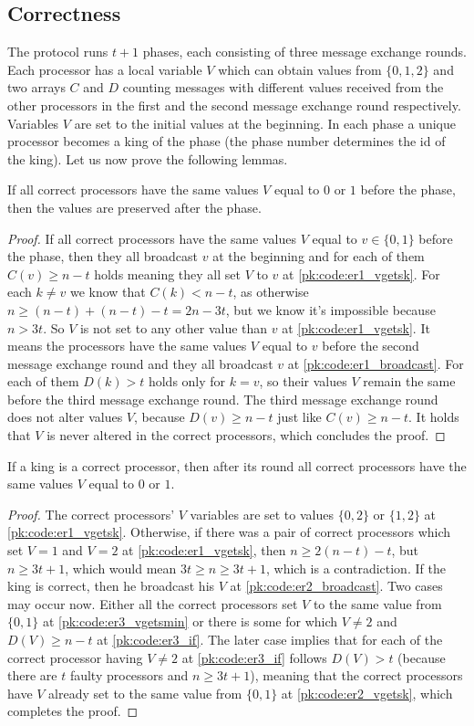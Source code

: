 \subsection{Correctness}
The protocol runs $t+1$ phases, each consisting of three message exchange rounds. Each processor has a local variable $V$ which can obtain values from $\{0,1,2\}$ and two arrays $C$ and $D$ counting messages with different values received from the other processors in the first and the second message exchange round respectively. Variables $V$ are set to the initial values at the beginning. In each phase a unique processor becomes a king of the phase (the phase number determines the id of the king). Let us now prove the following lemmas.
\begin{lemma}\label{pk:lem:preserve}
If all correct processors have the same values $V$ equal to $0$ or $1$ before the phase, then the values are preserved after the phase.
\end{lemma} 
\begin{proof}
If all correct processors have the same values $V$ equal to $v\in\{0,1\}$ before the phase, then they all broadcast $v$ at the beginning and for each of them $C(v) \geq n-t$ holds meaning they all set $V$ to $v$ at \cref{pk:code:er1_vgetsk}. For each $k\neq v$ we know that $C(k) < n-t$, as otherwise $n\geq (n-t) + (n-t) - t = 2n-3t$, but we know it's impossible because $n>3t$. So $V$ is not set to any other value than $v$ at \cref{pk:code:er1_vgetsk}. It means the processors have the same values $V$ equal to $v$ before the second message exchange round and they all broadcast $v$ at \cref{pk:code:er1_broadcast}. For each of them $D(k)>t$ holds only for $k=v$, so their values $V$ remain the same before the third message exchange round. The third message exchange round does not alter values $V$, because $D(v)\geq n-t$ just like $C(v)\geq n-t$. It holds that $V$ is never altered in the correct processors, which concludes the proof.
\end{proof}
\begin{lemma}\label{pk:lem:king}
If a king is a correct processor, then after its round all correct processors have the same values $V$ equal to $0$ or $1$.
\end{lemma} 
\begin{proof}
The correct processors' $V$ variables are set to values $\{0,2\}$ or $\{1,2\}$ at \cref{pk:code:er1_vgetsk}. Otherwise, if there was a pair of correct processors which set $V=1$ and $V=2$ at \cref{pk:code:er1_vgetsk}, then $n\ge2(n-t)-t$, but $n\geq 3t+1$, which would mean $3t\ge n \ge 3t+1$, which is a contradiction. If the king is correct, then he broadcast his $V$ at \cref{pk:code:er2_broadcast}. Two cases may occur now. Either all the correct processors set $V$ to the same value from $\{0,1\}$ at \cref{pk:code:er3_vgetsmin} or there is some for which $V\neq2$ and $D(V)\ge n-t$ at \cref{pk:code:er3_if}. The later case implies that for each of the correct processor having $V\neq2$ at \cref{pk:code:er3_if} follows $D(V)>t$ (because there are $t$ faulty processors and $n\geq 3t+1$), meaning that the correct processors have $V$ already set to the same value from $\{0,1\}$ at \cref{pk:code:er2_vgetsk}, which completes the proof.
\end{proof}
